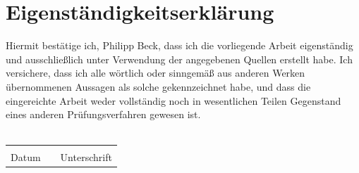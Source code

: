 \documentclass[12pt,twoside,a4paper]{scrartcl}
\numberwithin{equation}{section}
\theoremstyle{satz}
\theoremstyle{def}
\theoremstyle{exercise}
\newcommand{\blankpage}{
	\newpage
	\thispagestyle{empty}
	\mbox{}
	\newpage
}
\begin{document}
\tableofcontents


\blankpage


\blankpage

\newpage


\newpage
%
\blankpage


\blankpage
\newpage

\newpage

\newpage\blankpage

%
%
\newpage
\nocite{*}


\newpage \blankpage
\thispagestyle{empty}
\section*{Eigenständigkeitserklärung}

Hiermit bestätige ich, Philipp Beck, dass ich die vorliegende Arbeit eigenständig und ausschließlich unter Verwendung der angegebenen Quellen erstellt habe. 
Ich versichere, dass ich alle wörtlich oder sinngemäß aus anderen Werken übernommenen Aussagen als solche gekennzeichnet habe, und dass die eingereichte Arbeit weder vollständig noch in wesentlichen Teilen Gegenstand eines anderen Prüfungsverfahren gewesen ist.\\
\newline\\
\newline
\begin{tabular}{lp{2em}l}
	\hspace{3cm}   && \hspace{3cm} \\\cline{1-1}\cline{2-3}
	Datum     && Unterschrift
\end{tabular}
\vspace{1cm}

\end{document}
